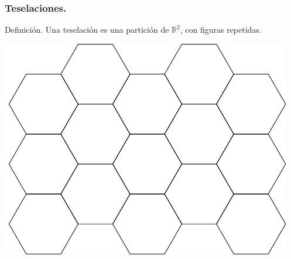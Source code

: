 \documentclass{beamer}
\begin{document}
\begin{frame}[t]
	\frametitle{Teselaciones.}
	\begin{block}{Definición.}
		Una teselación es una partición de \(\mathbb{R} ^2\), con figuras repetidas.
	\end{block}
	\vspace{2mm}
	\begin{exampleblock}{}
		\begin{overprint}
			\includegraphics[width= 0.7\linewidth, page = 1]{IMAGENES/1_DEF/12/tikz.pdf}
		\end{overprint}
	\end{exampleblock}
\end{frame}
\end{document}
